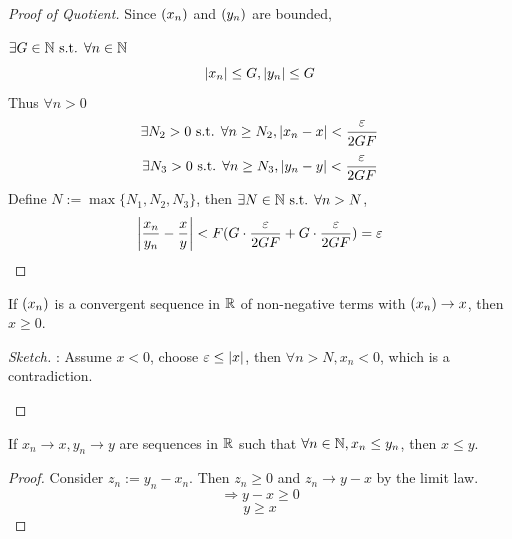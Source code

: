 \documentclass[a4paper,12pt]{article}
\begin{document}
\begin{theorem}
\begin{proof}[Proof of Quotient]
        Since \((x_{n})\) and \((y_{n})\) are bounded,
        
        \(\exists G\in\mathbb{N} \text{ s.t. } \forall n\in\mathbb{N}\)
        \[\left\lvert x_n\right\rvert\le G, \left\lvert y_n\right\rvert\le G\]
        Thus \(\forall n>0\)
        \[\exists N_2>0\text{ s.t. }\forall n\ge N_2, \left\lvert x_n-x\right\rvert<\frac{\varepsilon}{2GF}\]
        \[\exists N_3>0\text{ s.t. }\forall n\ge N_3, \left\lvert y_n-y\right\rvert<\frac{\varepsilon}{2GF}\]
        Define \(N:=\max{\{N_1,N_2,N_3\}}\), then \(\exists N\in\mathbb{N} \text{ s.t. } \forall n>N\),
        \[\left\lvert \frac{x_n}{y_n}-\frac{x}{y}\right\rvert<F(G\cdot\frac{\varepsilon}{2GF}+G\cdot\frac{\varepsilon}{2GF})=\varepsilon\]

    \end{proof}
\end{theorem}

\begin{theorem}
    If \((x_{n})\) is a convergent sequence in \(\mathbb{R}\) of non-negative terms with \((x_{n})\rightarrow x\), then \(x\ge 0\).
    \begin{proof}[Sketch]:
        Assume \(x<0\), choose \(\varepsilon \le \left\lvert x\right\rvert\), then \(\forall n > N, x_n<0\), which is a contradiction.
        \begin{center}
        \end{center}
    \end{proof} 
\end{theorem}

\newpage
\begin{theorem}
    If \(x_n\rightarrow x, y_n\rightarrow y\) are sequences in \(\mathbb{R}\) such that \(\forall n\in\mathbb{N}, x_n\le y_n\), 
    then \(x\le y\).

    \begin{proof}
        Consider \(z_n:=y_n-x_n\).
        Then \(z_n\ge 0\) and \(z_n\rightarrow y-x\) by the limit law.
        \[\Rightarrow y-x\ge 0\]
        \[y\ge x\]
    \end{proof}
\end{theorem}
\end{document}

